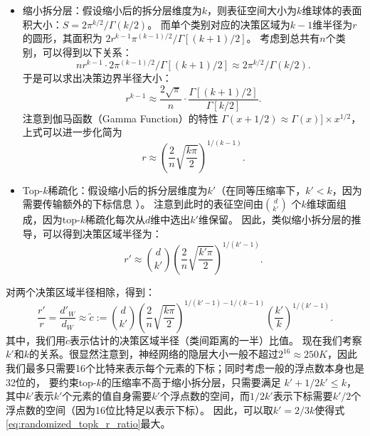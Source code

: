 \begin{itemize}
    \item 
    缩小拆分层：假设缩小后的拆分层维度为$k$，则表征空间大小为$k$维球体的表面积大小：$S = 2\pi^{k/2}/\Gamma(k/2)$。
    而单个类别对应的决策区域为$k - 1$维半径为$r$的圆形，其面积为 $2r^{k-1}\pi^{(k-1)/2} / \Gamma[(k + 1)/2]$。
    考虑到总共有$n$个类别，可以得到以下关系：
    \begin{equation}
        n r^{k-1} \cdot 2\pi^{(k-1)/2} / \Gamma[(k + 1)/2] \approx 2\pi^{k/2}/\Gamma(k/2).
    \end{equation}
    于是可以求出决策边界半径大小：
    \begin{equation}
        r^{k-1} \approx \dfrac{2\sqrt\pi}{n} \cdot \dfrac{\Gamma[(k+1)/2]}{\Gamma[k/2]}.
    \end{equation}
    注意到伽马函数（Gamma Function）的特性 $\Gamma(x + 1/2) \approx \Gamma(x) ]\times x^{1/2}$，上式可以进一步化简为
    \begin{equation}
        r \approx \left(\dfrac{2}{n} \sqrt{\dfrac{k\pi}{2}} \right)^{1/(k-1)}.
    \end{equation}

    \item
    Top-$k$稀疏化：假设缩小后的拆分层维度为$k'$（在同等压缩率下，$k' < k$，因为需要传输额外的下标信息 ）。
    注意到此时的表征空间由${d \choose k'}$ 个$k$维球面组成，因为top-$k$稀疏化每次从$d$维中选出$k'$维保留。
    因此，类似缩小拆分层的推导，可以得到决策区域半径为：
    \begin{equation}
        r' \approx {d \choose k'} \left(\dfrac{2}{n} \sqrt{\dfrac{k'\pi}{2}} \right)^{1/(k'-1)}.
    \end{equation}
\end{itemize}
%
对两个决策区域半径相除，得到：
\begin{equation}
\label{eq:randomized_topk_r_ratio}
    \dfrac{r'}{r} = \dfrac{d'_W}{d_W} \approx \tilde c := {d \choose k'} \left( \dfrac2n \sqrt{\dfrac{k\pi}{2}} \right)^
    {1/(k'-1) - 1/(k-1)} \left(\dfrac{k'}{k}\right)^{1/(k' - 1)}.
\end{equation}
%
其中，我们用$\tilde c$表示估计的决策区域半径（类间距离的一半）比值。
%
现在我们考察$k'$和$k$的关系。很显然注意到，神经网络的隐层大小一般不超过$2^{16}\approx 250K$，因此我们最多只需要16个比特来表示每个元素的下标；同时考虑一般的浮点数本身也是32位的，
要约束top-$k$的压缩率不高于缩小拆分层，只需要满足
$k' + 1/2 k' \le k$，其中$k'$表示$k'$个元素的值自身需要$k'$个浮点数的空间，而$1/2k'$表示下标需要$k'/2$个浮点数的空间（因为16位比特足以表示下标）。
%
因此，可以取$k' = 2/3 k$使得式\eqref{eq:randomized_topk_r_ratio}最大。
%

